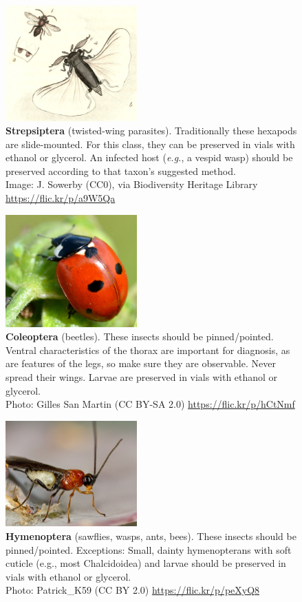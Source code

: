 \documentclass[letterpaper, 11pt]{article}
\begin{document}
\begin{figure}
  \caption{\textbf{Strepsiptera} (twisted-wing parasites). Traditionally these hexapods are slide-mounted. For this class, they can be preserved in vials with ethanol or glycerol. An infected host (\textit{e.g.}, a vespid wasp) should be preserved according to that taxon’s suggested method.\\ Image: J. Sowerby (CC0), via Biodiversity Heritage Library \url{https://flic.kr/p/a9W5Qa}}
  \includegraphics[width=0.45\textwidth]{Strepsiptera}
\end{figure}

\begin{figure}
  \caption{\textbf{Coleoptera} (beetles). These insects should be pinned/pointed. Ventral characteristics of the thorax are important for diagnosis, as are features of the legs, so make sure they are observable. Never spread their wings. Larvae are preserved in vials with ethanol or glycerol.\\ Photo: Gilles San Martin (CC BY-SA 2.0) \url{https://flic.kr/p/hCtNmf}}
  \includegraphics[width=0.45\textwidth]{Coleoptera}
\end{figure}

\begin{figure}
  \caption{\textbf{Hymenoptera} (sawflies, wasps, ants, bees). These insects should be pinned/pointed. Exceptions: Small, dainty hymenopterans with soft cuticle (e.g., most Chalcidoidea) and larvae should be preserved in vials with ethanol or glycerol.\\ Photo: Patrick\_K59 (CC BY 2.0) \url{https://flic.kr/p/peXyQ8}}
  \includegraphics[width=0.45\textwidth]{Hymenoptera}
\end{figure}



\end{document}
